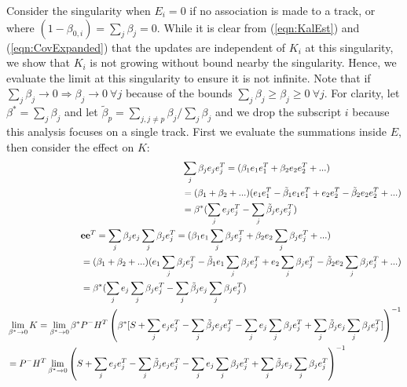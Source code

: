 \documentclass[10pt]{article}
\newcommand{\refeqn}[1]{(\ref{eqn:#1})}
\theoremstyle{plain}\theorembodyfont{\normalfont}
\begin{document}
Consider the singularity when $E_i=0$ if no association is made to a track, or where $(1-\beta_{0,i})=\sum\limits_{j}\beta_j=0$.
While it is clear from \refeqn{KalEst} and \refeqn{CovExpanded} that the updates are independent of $K_i$ at this singularity, we show that $K_i$ is not growing without bound nearby the singularity.
Hence, we evaluate the limit at this singularity to ensure it is not infinite.
Note that if $\sum\limits_{j}\beta_j\rightarrow0\Rightarrow \beta_j\rightarrow0\ \forall j$ because of the bounds $\sum\limits_{j}\beta_j\geq\beta_j\geq0\ \forall j$. For clarity, let $\beta^*=\sum\limits_{j}\beta_j$ and let $\tilde\beta_p=\sum\limits_{j,j\neq p}\beta_j/\sum\limits_{j}\beta_j$ and we drop the subscript $i$ because this analysis focuses on a single track. First we evaluate the summations inside $E$, then consider the effect on $K$:
\begin{align}
\begin{split}
&\sum\limits_{j} \beta_{j}e_{j}e_{j}^T=(\beta_1e_1e_1^T+\beta_2e_2e_2^T+...)
\\
&=(\beta_1+\beta_2+...)
(e_1e_1^T-\tilde\beta_1e_1e_1^T+
e_2e_2^T-\tilde\beta_2e_2e_2^T+...)
\\
&=\beta^*(\sum\limits_{j}e_{j}e_{j}^T-\sum\limits_{j}\tilde\beta_je_{j}e_{j}^T)
\end{split}
\\
\begin{split}
&{{\bf{e}}}{\bf{e}}^T=\sum\limits_{j} \beta_{j}e_{j}\sum\limits_{j} \beta_{j}e_{j}^T=
(\beta_1e_1\sum\limits_{j} \beta_{j}e_{j}^T+\beta_2e_2\sum\limits_{j} \beta_{j}e_{j}^T+...)
\\
&=(\beta_1+\beta_2+...)(e_1\sum\limits_{j} \beta_{j}e_{j}^T-\tilde\beta_1e_1\sum\limits_{j} \beta_{j}e_{j}^T+
e_2\sum\limits_{j} \beta_{j}e_{j}^T-\tilde\beta_2e_2\sum\limits_{j} \beta_{j}e_{j}^T+...)
\\
&=\beta^*(\sum\limits_{j}e_{j}\sum\limits_{j}\beta_je_{j}^T-\sum\limits_{j}\tilde\beta_je_{j}\sum\limits_{j}\beta_je_{j}^T)
\end{split}
\\
\begin{split}
&\lim_{\beta^* \to 0}K=\lim_{\beta^* \to 0}\beta^*P^-H^T
\left(\beta^*[S+\sum\limits_{j}e_{j}e_{j}^T-\sum\limits_{j}\tilde\beta_je_{j}e_{j}^T-\sum\limits_{j}e_{j}\sum\limits_{j}\beta_je_{j}^T+\sum\limits_{j}\tilde\beta_je_{j}\sum\limits_{j}\beta_je_{j}^T]\right)^{-1}
\\
&=P^-H^T\lim_{\beta^* \to 0}
\left(S+\sum\limits_{j}e_{j}e_{j}^T-\sum\limits_{j}\tilde\beta_je_{j}e_{j}^T-\sum\limits_{j}e_{j}\sum\limits_{j}\beta_je_{j}^T+\sum\limits_{j}\tilde\beta_je_{j}\sum\limits_{j}\beta_je_{j}^T\right)^{-1}
\label{eqn:OptGainNoSingularity}
\end{split}
\end{align}
\end{document}
